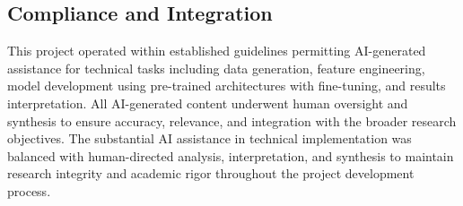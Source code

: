 \subsection{Compliance and Integration}

This project operated within established guidelines permitting AI-generated assistance for technical tasks including data generation, feature engineering, model development using pre-trained architectures with fine-tuning, and results interpretation. All AI-generated content underwent human oversight and synthesis to ensure accuracy, relevance, and integration with the broader research objectives. The substantial AI assistance in technical implementation was balanced with human-directed analysis, interpretation, and synthesis to maintain research integrity and academic rigor throughout the project development process.